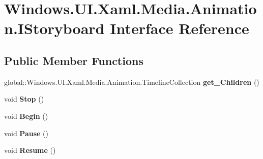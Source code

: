 \hypertarget{interface_windows_1_1_u_i_1_1_xaml_1_1_media_1_1_animation_1_1_i_storyboard}{}\section{Windows.\+U\+I.\+Xaml.\+Media.\+Animation.\+I\+Storyboard Interface Reference}
\label{interface_windows_1_1_u_i_1_1_xaml_1_1_media_1_1_animation_1_1_i_storyboard}
\subsection*{Public Member Functions}
\begin{DoxyCompactItemize}
\item 
\mbox{\label{interface_windows_1_1_u_i_1_1_xaml_1_1_media_1_1_animation_1_1_i_storyboard_a4d9df632c9aa2afcb3d619dcbb357776}} 
global\+::\+Windows.\+U\+I.\+Xaml.\+Media.\+Animation.\+Timeline\+Collection {\bfseries get\+\_\+\+Children} ()
\item 
\mbox{\label{interface_windows_1_1_u_i_1_1_xaml_1_1_media_1_1_animation_1_1_i_storyboard_acdc53aada6a43b3d82536e1968449961}} 
void {\bfseries Stop} ()
\item 
\mbox{\label{interface_windows_1_1_u_i_1_1_xaml_1_1_media_1_1_animation_1_1_i_storyboard_acecbf19b19efcd680ab801ea7583213d}} 
void {\bfseries Begin} ()
\item 
\mbox{\label{interface_windows_1_1_u_i_1_1_xaml_1_1_media_1_1_animation_1_1_i_storyboard_ab6962da9d22e4e6074b1b55d16e501c6}} 
void {\bfseries Pause} ()
\item 
\mbox{\label{interface_windows_1_1_u_i_1_1_xaml_1_1_media_1_1_animation_1_1_i_storyboard_ac730df45ba536de8f998a9a99c6995d6}} 
void {\bfseries Resume} ()
\item 
\mbox{\label{interface_windows_1_1_u_i_1_1_xaml_1_1_media_1_1_animation_1_1_i_storyboard_a921af38756f68389523f29696421dc20}} 

\end{DoxyCompactItemize}
